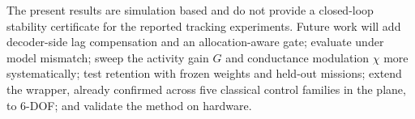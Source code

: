 \documentclass[letterpaper, 10 pt, conference]{ieeeconf}
\begin{document}
The present results are simulation based and do not provide a closed-loop stability certificate for the reported tracking experiments. Future work will add decoder-side lag compensation and an allocation-aware gate; evaluate under model mismatch; sweep the activity gain $G$ and conductance modulation $\chi$ more systematically; test retention with frozen weights and held-out missions; extend the wrapper, already confirmed across five classical control families in the plane, to 6-DOF; and validate the method on hardware.



\end{document}
